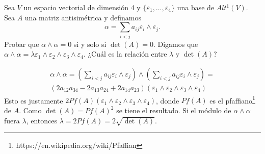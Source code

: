 \documentclass[twoside]{article}
\begin{document}
\newpage

\begin{ejercicio}{2.10}
Sea $V$ un espacio vectorial de dimensión 4 y $\{\varepsilon_1,\dots,\varepsilon_4\}$ una base de $Alt^1(V)$. Sea $A$ una matriz antisimétrica y definamos
\[
\alpha=\sum_{i<j}a_{ij}\varepsilon_i\land\varepsilon_j.
\]
Probar que $\alpha\land\alpha=0$ si y solo si $\det(A)=0$.  Digamos que $\alpha\land\alpha=\lambda\varepsilon_1\land\varepsilon_2\land\varepsilon_3\land\varepsilon_4$. ¿Cuál es la relación entre $\lambda$ y $\det(A)$?
\end{ejercicio}
\begin{solucion}
\begin{gather*}
\alpha\land\alpha=(\sum_{i<j}a_{ij}\varepsilon_i\land\varepsilon_j)\land (\sum_{i<j}a_{ij}\varepsilon_i\land\varepsilon_j)=\\
(2a_{12}a_{34}-2a_{13}a_{24}+2a_{14}a_{23})(\varepsilon_1\land\varepsilon_2\land\varepsilon_3\land\varepsilon_4)
\end{gather*}
Esto es justamente $2Pf(A)(\varepsilon_1\land\varepsilon_2\land\varepsilon_3\land\varepsilon_4)$, donde $Pf(A)$ es el pfaffiano\footnote{https://en.wikipedia.org/wiki/Pfaffian} de $A$. Como $\det(A)=Pf(A)^2$ se tiene el resultado. Si el módulo de $\alpha\land\alpha$ fuera $\lambda$, entonces $\lambda=2Pf(A)=2\sqrt{\det(A)}$. 
\end{solucion}
\end{document}
